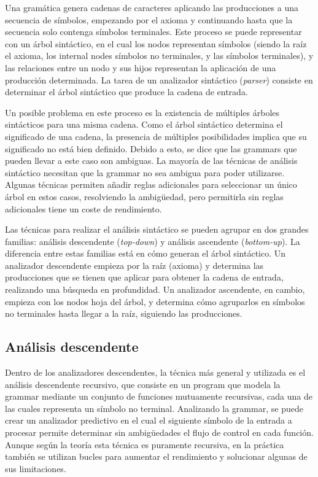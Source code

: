 Una gramática genera cadenas de caracteres aplicando las producciones a una
secuencia de símbolos, empezando por el axioma y continuando hasta que la
secuencia solo contenga símbolos terminales. Este proceso se puede representar
con un árbol sintáctico, en el cual los nodos representan símbolos (siendo la
raíz el axioma, los \glspl{internal node} símbolos no terminales, y las
 símbolos terminales), y las relaciones entre un nodo
y sus hijos representan la aplicación de una producción determinada. La tarea de
un analizador sintáctico (\textit{\gls{parser}}) consiste en determinar el árbol
sintáctico que produce la cadena de entrada. \parencite{dragon-book}

Un posible problema en este proceso es la existencia de múltiples árboles
sintácticos para una misma cadena. Como el árbol sintáctico determina el
significado de una cadena, la presencia de múltiples posibilidades implica que
su significado no está bien definido. Debido a esto, se dice que las
\glspl{grammar} que pueden llevar a este caso son ambiguas. La mayoría de las
técnicas de análisis sintáctico necesitan que la \gls{grammar} no sea ambigua
para poder utilizarse. Algunas técnicas permiten añadir reglas adicionales para
seleccionar un único árbol en estos casos, resolviendo la ambigüedad, pero
permitirla sin reglas adicionales tiene un coste de rendimiento.
\parencite{dragon-book}

Las técnicas para realizar el análisis sintáctico se pueden agrupar en dos
grandes familias: análisis descendente (\textit{top-down}) y análisis ascendente
(\textit{bottom-up}). La diferencia entre estas familias está en cómo generan el
árbol sintáctico. Un analizador descendente empieza por la raíz (axioma) y
determina las producciones que se tienen que aplicar para obtener la cadena de
entrada, realizando una búsqueda en profundidad. Un analizador ascendente, en
cambio, empieza con los nodos hoja del árbol, y determina cómo agruparlos en
símbolos no terminales hasta llegar a la raíz, siguiendo las producciones.
\parencite{dragon-book}

\subsection{Análisis descendente}

Dentro de los analizadores descendentes, la técnica más general y utilizada es
el análisis descendente recursivo, que consiste en un \gls{program} que modela
la \gls{grammar} mediante un conjunto de funciones mutuamente recursivas, cada
una de las cuales representa un símbolo no terminal. Analizando la
\gls{grammar}, se puede crear un analizador predictivo en el cual el siguiente
símbolo de la entrada a procesar permite determinar sin ambigüedades el flujo de
control en cada función. Aunque según la teoría esta técnica es puramente
recursiva, en la práctica también se utilizan bucles para aumentar el
rendimiento y solucionar algunas de sus limitaciones. \parencite{dragon-book}

